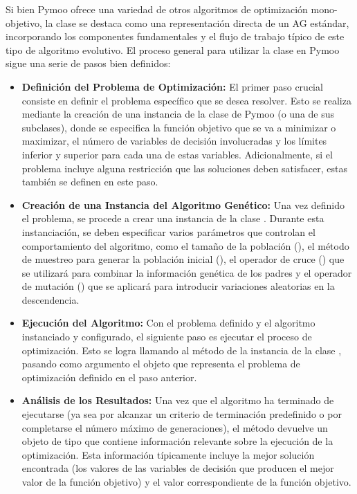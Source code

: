 Si bien Pymoo ofrece una variedad de otros algoritmos de optimización mono-objetivo, la clase \texttt{} se destaca como una representación directa de un AG estándar, incorporando los componentes fundamentales y el flujo de trabajo típico de este tipo de algoritmo evolutivo. El proceso general para utilizar la clase \texttt{} en Pymoo sigue una serie de pasos bien definidos:
\begin{itemize}
    \item \textbf{Definición del Problema de Optimización:} El primer paso crucial consiste en definir el problema específico que se desea resolver. Esto se realiza mediante la creación de una instancia de la clase \texttt{} de Pymoo (o una de sus subclases), donde se especifica la función objetivo que se va a minimizar o maximizar, el número de variables de decisión involucradas y los límites inferior y superior para cada una de estas variables. Adicionalmente, si el problema incluye alguna restricción que las soluciones deben satisfacer, estas también se definen en este paso.
    \item \textbf{Creación de una Instancia del Algoritmo Genético:} Una vez definido el problema, se procede a crear una instancia de la clase \texttt{}. Durante esta instanciación, se deben especificar varios parámetros que controlan el comportamiento del algoritmo, como el tamaño de la población (\texttt{}), el método de muestreo para generar la población inicial (\texttt{}), el operador de cruce (\texttt{}) que se utilizará para combinar la información genética de los padres y el operador de mutación (\texttt{}) que se aplicará para introducir variaciones aleatorias en la descendencia.
    \item \textbf{Ejecución del Algoritmo:} Con el problema definido y el algoritmo instanciado y configurado, el siguiente paso es ejecutar el proceso de optimización. Esto se logra llamando al método \texttt{} de la instancia de la clase \texttt{}, pasando como argumento el objeto que representa el problema de optimización definido en el paso anterior.
    \item \textbf{Análisis de los Resultados:} Una vez que el algoritmo ha terminado de ejecutarse (ya sea por alcanzar un criterio de terminación predefinido o por completarse el número máximo de generaciones), el método \texttt{} devuelve un objeto de tipo \texttt{} que contiene información relevante sobre la ejecución de la optimización. Esta información típicamente incluye la mejor solución encontrada (los valores de las variables de decisión que producen el mejor valor de la función objetivo) y el valor correspondiente de la función objetivo.
\end{itemize}

